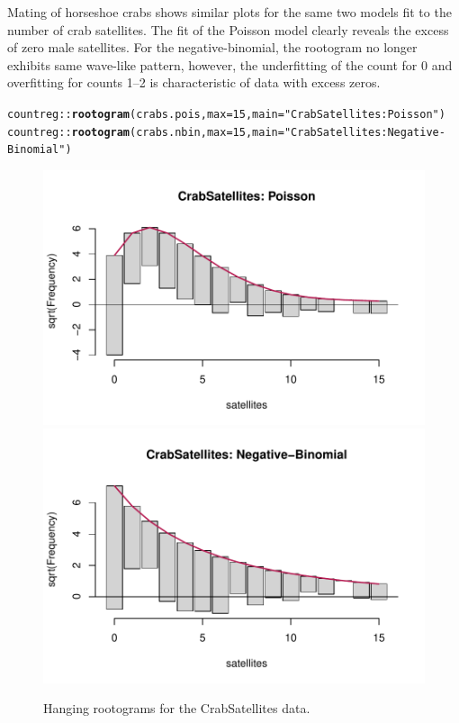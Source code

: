 \documentclass[11pt]{book}\usepackage[]{graphicx}\usepackage[]{color}
\makeatletter
\newcommand{\hlnum}[1]{\textcolor[rgb]{0.686,0.059,0.569}{#1}}%
\newcommand{\hlstr}[1]{\textcolor[rgb]{0.192,0.494,0.8}{#1}}%
\newcommand{\hlstd}[1]{\textcolor[rgb]{0.345,0.345,0.345}{#1}}%
\newcommand{\hlkwc}[1]{\textcolor[rgb]{0.333,0.667,0.333}{#1}}%
\newcommand{\hlkwd}[1]{\textcolor[rgb]{0.737,0.353,0.396}{\textbf{#1}}}%
\newenvironment{kframe}{%
 \def\at@end@of@kframe{}%
 \ifinner\ifhmode%
  \def\at@end@of@kframe{\end{minipage}}%
  \begin{minipage}{\columnwidth}%
 \fi\fi%
 \def\FrameCommand##1{\hskip\@totalleftmargin \hskip-\fboxsep
 \colorbox{shadecolor}{##1}\hskip-\fboxsep
     \hskip-\linewidth \hskip-\@totalleftmargin \hskip\columnwidth}%
 \MakeFramed {\advance\hsize-\width
   \@totalleftmargin\z@ \linewidth\hsize
   \@setminipage}}%
 {\par\unskip\endMakeFramed%
 \at@end@of@kframe}
\newenvironment{knitrout}{}{} %
\renewenvironment{knitrout}{\small\renewcommand{\baselinestretch}{.85}}{} %
\makeatother
\begin{document}
\begin{Example}[crabs2]{Mating of horseshoe crabs}
 shows similar plots for the same two models fit to the number of
crab satellites.  The fit of the Poisson model clearly reveals the excess of zero male satellites.
For the negative-binomial, the rootogram no longer exhibits same wave-like pattern, 
however, the underfitting of the count for 0 and overfitting for counts 1--2 is 
characteristic of data with excess zeros.

\begin{knitrout}
\color{fgcolor}\begin{kframe}
\begin{alltt}
\hlstd{countreg::}\hlkwd{rootogram}\hlstd{(crabs.pois,} \hlkwc{max}\hlstd{=}\hlnum{15}\hlstd{,} \hlkwc{main}\hlstd{=}\hlstr{"CrabSatellites: Poisson"}\hlstd{)}
\hlstd{countreg::}\hlkwd{rootogram}\hlstd{(crabs.nbin,} \hlkwc{max}\hlstd{=}\hlnum{15}\hlstd{,} \hlkwc{main}\hlstd{=}\hlstr{"CrabSatellites: Negative-Binomial"}\hlstd{)}
\end{alltt}
\end{kframe}\begin{figure}[!htbp]


\centerline{\includegraphics[width=.49\textwidth]{ch09/fig/crabs2-rootogram1} 
\includegraphics[width=.49\textwidth]{ch09/fig/crabs2-rootogram2} }

\caption[Hanging rootograms for the CrabSatellites data]{Hanging rootograms for the CrabSatellites data.\label{fig:crabs2-rootogram}}
\end{figure}


\end{knitrout}
\end{Example}
\end{document}
